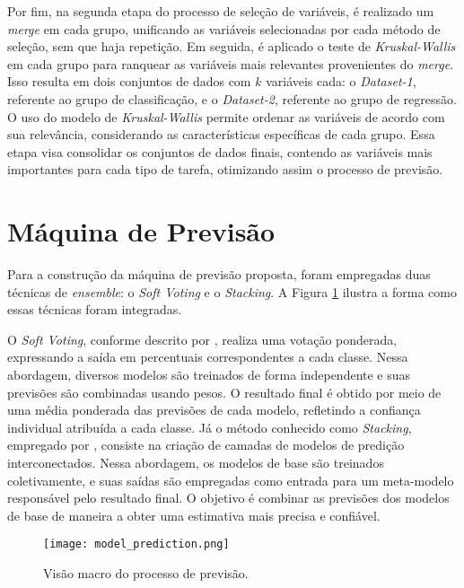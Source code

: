 Por fim, na segunda etapa do processo de seleção de variáveis, é realizado um \textit{merge} em cada grupo, unificando as variáveis selecionadas por cada método de seleção, sem que haja repetição. Em seguida, é aplicado o teste de \textit{Kruskal-Wallis} em cada grupo para ranquear as variáveis mais relevantes provenientes do \textit{merge}. Isso resulta em dois conjuntos de dados com $k$ variáveis cada: o \textit{Dataset-1}, referente ao grupo de classificação, e o \textit{Dataset-2}, referente ao grupo de regressão. O uso do modelo de \textit{Kruskal-Wallis} permite ordenar as variáveis de acordo com sua relevância, considerando as características específicas de cada grupo. Essa etapa visa consolidar os conjuntos de dados finais, contendo as variáveis mais importantes para cada tipo de tarefa, otimizando assim o processo de previsão.




\section{Máquina de Previsão}
\label{sec:previsao}
Para a construção da máquina de previsão proposta, foram empregadas duas técnicas de \textit{ensemble}: o \textit{Soft Voting} e o \textit{Stacking}. A Figura \ref{fig:model_prediction} ilustra a forma como essas técnicas foram integradas.

O \textit{Soft Voting}, conforme descrito por , realiza uma votação ponderada, expressando a saída em percentuais correspondentes a cada classe. Nessa abordagem, diversos modelos são treinados de forma independente e suas previsões são combinadas usando pesos. O resultado final é obtido por meio de uma média ponderada das previsões de cada modelo, refletindo a confiança individual atribuída a cada classe.
Já o método conhecido como \textit{Stacking}, empregado por , consiste na criação de camadas de modelos de predição interconectados. Nessa abordagem, os modelos de base são treinados coletivamente, e suas saídas são empregadas como entrada para um meta-modelo responsável pelo resultado final. O objetivo é combinar as previsões dos modelos de base de maneira a obter uma estimativa mais precisa e confiável.

\begin{figure}[htbp]
    \caption{Visão macro do processo de previsão.}
      \centering
    \texttt{[image: model\_prediction.png]} 
    \label{fig:model_prediction}
\end{figure}

